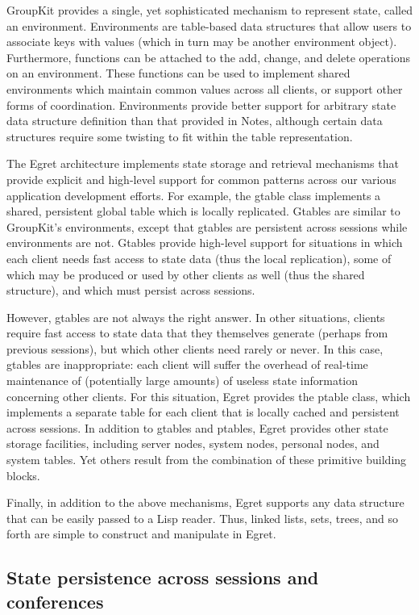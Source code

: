 GroupKit provides a single, yet sophisticated mechanism to represent state,
called an environment. Environments are table-based data structures that
allow users to associate keys with values (which in turn may be another
environment object).  Furthermore, functions can be attached to the add,
change, and delete operations on an environment. These functions can be
used to implement shared environments which maintain common values across
all clients, or support other forms of coordination.  Environments provide
better support for arbitrary state data structure definition than that
provided in Notes, although certain data structures require some twisting
to fit within the table representation.

The Egret architecture implements state storage and retrieval mechanisms
that provide explicit and high-level support for common patterns across our
various application development efforts. For example, the gtable class
implements a shared, persistent global table which is locally
replicated. Gtables are similar to GroupKit's environments, except that
gtables are persistent across sessions while environments are not.  Gtables
provide high-level support for situations in which each client needs fast
access to state data (thus the local replication), some of which may be
produced or used by other clients as well (thus the shared structure), and
which must persist across sessions.

However, gtables are not always the right answer. In other situations,
clients require fast access to state data that they themselves generate
(perhaps from previous sessions), but which other clients need rarely or
never.  In this case, gtables are inappropriate: each client will suffer
the overhead of real-time maintenance of (potentially large amounts) of
useless state information concerning other clients. For this situation,
Egret provides the ptable class, which implements a separate table for each
client that is locally cached and persistent across sessions.  In addition
to gtables and ptables, Egret provides other state storage facilities,
including server nodes, system nodes, personal nodes, and system tables.
Yet others result from the combination of these primitive building blocks.

Finally, in addition to the above mechanisms, Egret supports any data
structure that can be easily passed to a Lisp reader.  Thus, linked lists,
sets, trees, and so forth are simple to construct and manipulate in Egret.

\subsection{State persistence across sessions and conferences}

